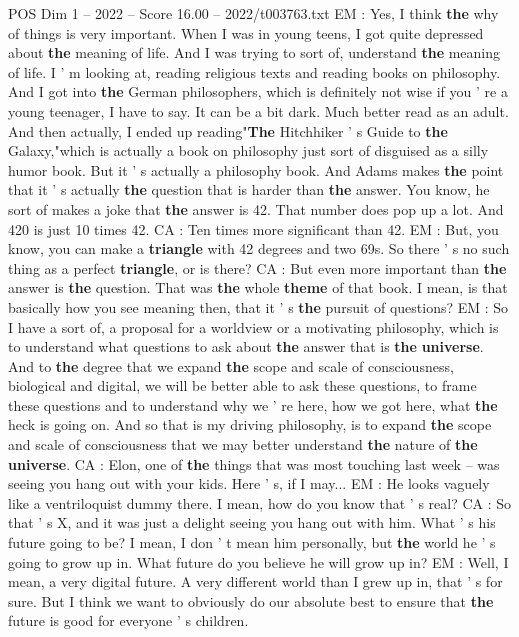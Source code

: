 \begin{textsample}{POS Dim 1 – 2022 – Score 16.00 – 2022/t003763.txt}
EM : Yes, I think \textbf{the} why of things is very important.
When I was in young teens, I got quite depressed about \textbf{the} meaning of life.
And I was trying to sort of, understand \textbf{the} meaning of life.
I ' m looking at, reading religious texts and reading books on philosophy.
And I got into \textbf{the} German philosophers, which is definitely not wise if you ' re a young teenager, I have to say.
It can be a bit dark.
Much better read as an adult.
And then actually, I ended up reading"\textbf{The} Hitchhiker ' s Guide to \textbf{the} Galaxy,"which is actually a book on philosophy just sort of disguised as a silly humor book.
But it ' s actually a philosophy book.
And Adams makes \textbf{the} point that it ' s actually \textbf{the} question that is harder than \textbf{the} answer.
You know, he sort of makes a joke that \textbf{the} answer is 42.
That number does pop up a lot.
And 420 is just 10 times 42.
CA : Ten times more significant than 42.
EM : But, you know, you can make a \textbf{triangle} with 42 degrees and two 69s.
So there ' s no such thing as a perfect \textbf{triangle}, or is there?
CA : But even more important than \textbf{the} answer is \textbf{the} question.
That was \textbf{the} whole \textbf{theme} of that book.
I mean, is that basically how you see meaning then, that it ' s \textbf{the} pursuit of questions?
EM : So I have a sort of, a proposal for a worldview or a motivating philosophy, which is to understand what questions to ask about \textbf{the} answer that is \textbf{the} \textbf{universe}.
And to \textbf{the} degree that we expand \textbf{the} scope and scale of consciousness, biological and digital, we will be better able to ask these questions, to frame these questions and to understand why we ' re here, how we got here, what \textbf{the} heck is going on.
And so that is my driving philosophy, is to expand \textbf{the} scope and scale of consciousness that we may better understand \textbf{the} nature of \textbf{the} \textbf{universe}.
CA : Elon, one of \textbf{the} things that was most touching last week -- was seeing you hang out with your kids.
Here ' s, if I may...
EM : He looks vaguely like a ventriloquist dummy there.
I mean, how do you know that ' s real?
CA : So that ' s X, and it was just a delight seeing you hang out with him.
What ' s his future going to be?
I mean, I don ' t mean him personally, but \textbf{the} world he ' s going to grow up in.
What future do you believe he will grow up in?
EM : Well, I mean, a very digital future.
A very different world than I grew up in, that ' s for sure.
But I think we want to obviously do our absolute best to ensure that \textbf{the} future is good for everyone ' s children.

\end{textsample}
